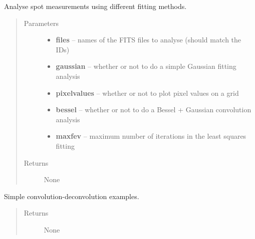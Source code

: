 \documentclass[a4paper,11pt,english]{sphinxmanual}
\begin{document}

\begin{fulllineitems}
\label{analysis:analysis.analyseSpotMeasurements.analyseSpotsFitting}
Analyse spot measurements using different fitting methods.
\begin{quote}\begin{description}
\item[{Parameters}] \leavevmode\begin{itemize}
\item {} 
\textbf{files} -- names of the FITS files to analyse (should match the IDs)

\item {} 
\textbf{gaussian} -- whether or not to do a simple Gaussian fitting analysis

\item {} 
\textbf{pixelvalues} -- whether or not to plot pixel values on a grid

\item {} 
\textbf{bessel} -- whether or not to do a Bessel + Gaussian convolution analysis

\item {} 
\textbf{maxfev} -- maximum number of iterations in the least squares fitting

\end{itemize}

\item[{Returns}] \leavevmode
None

\end{description}\end{quote}

\end{fulllineitems}


\begin{fulllineitems}
\label{analysis:analysis.analyseSpotMeasurements.examples}
Simple convolution-deconvolution examples.
\begin{quote}\begin{description}
\item[{Returns}] \leavevmode
None

\end{description}\end{quote}

\end{fulllineitems}
\end{document}
